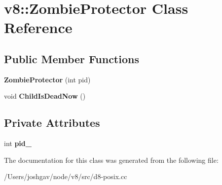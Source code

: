 \hypertarget{classv8_1_1_zombie_protector}{}\section{v8\+:\+:Zombie\+Protector Class Reference}
\label{classv8_1_1_zombie_protector}
\subsection*{Public Member Functions}
\begin{DoxyCompactItemize}
\item 
{\bfseries Zombie\+Protector} (int pid)\hypertarget{classv8_1_1_zombie_protector_ada6e7c6ad75a7e51dd15d747e30296ec}{}\label{classv8_1_1_zombie_protector_ada6e7c6ad75a7e51dd15d747e30296ec}

\item 
void {\bfseries Child\+Is\+Dead\+Now} ()\hypertarget{classv8_1_1_zombie_protector_afd835b383e9b8127209d8dc518637f23}{}\label{classv8_1_1_zombie_protector_afd835b383e9b8127209d8dc518637f23}

\end{DoxyCompactItemize}
\subsection*{Private Attributes}
\begin{DoxyCompactItemize}
\item 
int {\bfseries pid\+\_\+}\hypertarget{classv8_1_1_zombie_protector_ab76c7c4b3e9eae445a592daae0b271d4}{}\label{classv8_1_1_zombie_protector_ab76c7c4b3e9eae445a592daae0b271d4}

\end{DoxyCompactItemize}


The documentation for this class was generated from the following file\+:\begin{DoxyCompactItemize}
\item 
/\+Users/joshgav/node/v8/src/d8-\/posix.\+cc\end{DoxyCompactItemize}
